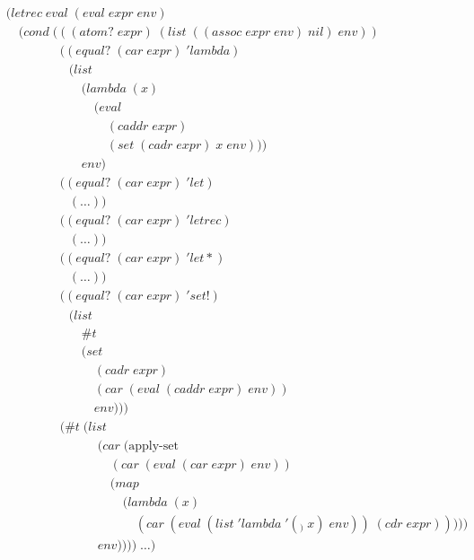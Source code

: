 \begin{figure}[htp]
\caption{}\label{fig:monadicEval}
\begin{align*}
& (letrec \; eval \; (eval \; expr \; env)
\\& \quad (cond \; (((atom? \; expr) \; (list \; ((assoc \; expr \; env) \; nil) \; env))
\\& \qquad \qquad \; ((equal? \; (car \; expr) \; 'lambda) \; 
\\& \qquad \qquad \quad (list
\\& \qquad \qquad \qquad (lambda \; (x) \; 
\\& \qquad \qquad \qquad \quad (eval \; 
\\& \qquad \qquad \qquad \qquad (caddr \; expr) \; 
\\& \qquad \qquad \qquad \qquad (set \; (cadr \; expr) \; x \; env)))
\\& \qquad \qquad \qquad env)
\\& \qquad \qquad \; ((equal? \; (car \; expr) \; 'let)
\\& \qquad \qquad \quad (\dots))
\\& \qquad \qquad \; ((equal? \; (car \; expr) \; 'letrec)
\\& \qquad \qquad \quad (\dots))
\\& \qquad \qquad \; ((equal? \; (car \; expr) \; 'let*) \; 
\\& \qquad \qquad \quad (\dots))
\\& \qquad \qquad \; ((equal? \; (car \; expr) \; 'set!)
\\& \qquad \qquad \quad (list \; 
\\& \qquad \qquad \qquad \#t \; 
\\& \qquad \qquad \qquad (set \; 
\\& \qquad \qquad \qquad \quad (cadr \; expr) \; 
\\& \qquad \qquad \qquad \quad (car \; (eval \; (caddr \; expr) \; env)) \; 
\\& \qquad \qquad \qquad \quad env)))
\\& \qquad \qquad \; (\#t \; (list
\\& \qquad \qquad \qquad \quad \; (car \; (\text{apply-set} \; 
\\& \qquad \qquad \qquad \qquad \; (car \; (eval \; (car \; expr) \; env))
\\& \qquad \qquad \qquad \qquad \; (map \; 
\\& \qquad \qquad \qquad \qquad \quad \; (lambda \; (x) \; 
\\& \qquad \qquad \qquad \qquad \qquad \; (car \; (eval \; (list \; 'lambda \; '(_) \; x) \; env)) \; (cdr \; expr)))))
\\& \qquad \qquad \qquad \quad \; env)))) \; \dots)
\end{align*}
\end{figure}

